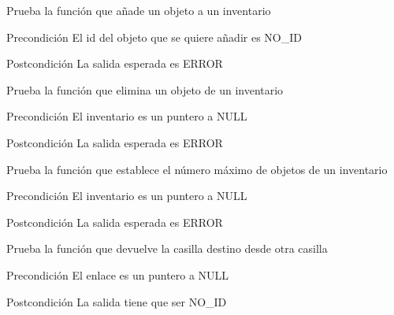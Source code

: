 \begin{DoxyRefList}
\item[\label{test__test000117}%
\hypertarget{test__test000117}{}%
Global \hyperlink{inventory__test_8c_a77405dc2e23bc5e07f88194ade40a454}{test3\-\_\-inventory\-\_\-add\-\_\-object} ()]Prueba la función que añade un objeto a un inventario \begin{DoxyPrecond}{Precondición}
El id del objeto que se quiere añadir es N\-O\-\_\-\-I\-D 
\end{DoxyPrecond}
\begin{DoxyPostcond}{Postcondición}
La salida esperada es E\-R\-R\-O\-R  
\end{DoxyPostcond}

\item[\label{test__test000125}%
\hypertarget{test__test000125}{}%
Global \hyperlink{inventory__test_8c_a2e3416a88f9c36ab13de940634c845b6}{test3\-\_\-inventory\-\_\-remove\-\_\-object} ()]Prueba la función que elimina un objeto de un inventario \begin{DoxyPrecond}{Precondición}
El inventario es un puntero a N\-U\-L\-L 
\end{DoxyPrecond}
\begin{DoxyPostcond}{Postcondición}
La salida esperada es E\-R\-R\-O\-R  
\end{DoxyPostcond}

\item[\label{test__test000120}%
\hypertarget{test__test000120}{}%
Global \hyperlink{inventory__test_8c_a4498b503058368cf411a4c9f1edd8900}{test3\-\_\-inventory\-\_\-set\-\_\-max} ()]Prueba la función que establece el número máximo de objetos de un inventario \begin{DoxyPrecond}{Precondición}
El inventario es un puntero a N\-U\-L\-L 
\end{DoxyPrecond}
\begin{DoxyPostcond}{Postcondición}
La salida esperada es E\-R\-R\-O\-R  
\end{DoxyPostcond}

\item[\label{test__test000156}%
\hypertarget{test__test000156}{}%
Global \hyperlink{link__test_8c_ac55d361401086459b8829901659d765e}{test3\-\_\-link\-\_\-get\-\_\-dest\-\_\-from} ()]Prueba la función que devuelve la casilla destino desde otra casilla \begin{DoxyPrecond}{Precondición}
El enlace es un puntero a N\-U\-L\-L 
\end{DoxyPrecond}
\begin{DoxyPostcond}{Postcondición}
La salida tiene que ser N\-O\-\_\-\-I\-D  
\end{DoxyPostcond}


\end{DoxyRefList}

